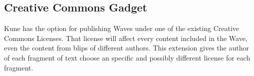 \subsection{Creative Commons Gadget}

Kune has the option for publishing Waves under one of the existing Creative Commons Licenses. That license will affect every content included in the Wave, even the content from blips of different authors. This extension gives the author of each fragment of text choose an specific and possibly different license for each fragment.
